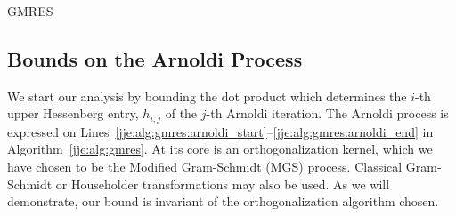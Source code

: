 \begin{algorithm}
\caption{GMRES}
\label{jje:alg:gmres}
\begin{algorithmic}[1]
\label{jje:alg:gmres:arnoldi_start}
  \label{jje:alg:gmres:orthog_start_vec}
  \label{jje:alg:gmres:mgs_start}
    \label{jje:alg:gmres:hij}
    \label{jje:alg:gmres:wi}
  \EndFor
  \label{jje:alg:gmres:mgs_end}
  \label{jje:alg:gmres:hjp1}
 \label{jje:alg:gmres:happyCheck}
       \label{jje:alg:GMRES:happy_breakdown}
  \EndIf
{}
  \label{jje:alg:gmres:arnoldi_end}
\EndFor
\end{algorithmic}
\end{algorithm}





\subsection{Bounds on the Arnoldi Process}
\label{jje:sec:gmres:bounds}


We start our analysis by bounding the dot product which determines the
$i$-th upper Hessenberg entry, $h_{i,j}$ of the $j$-th Arnoldi
iteration. The Arnoldi process is expressed on
Lines~\ref{jje:alg:gmres:arnoldi_start}--\ref{jje:alg:gmres:arnoldi_end}
in Algorithm~\ref{jje:alg:gmres}.  At its core is an orthogonalization
kernel, which we have chosen to be the Modified Gram-Schmidt (MGS)
process.  Classical Gram-Schmidt or Householder transformations may
also be used.  As we will demonstrate, our bound is invariant of the
orthogonalization algorithm chosen.

